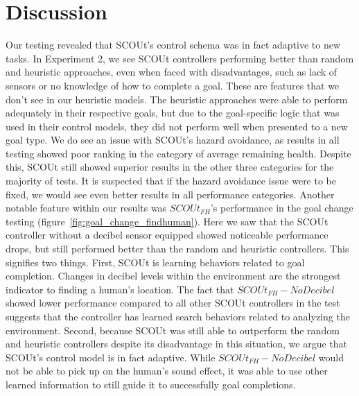 \section{Discussion}
Our testing revealed that SCOUt's control schema was in fact adaptive to new tasks.
In Experiment 2, we see SCOUt controllers performing better than random and heuristic approaches, even when faced with disadvantages, such as lack of sensors or no knowledge of how to complete a goal.
These are features that we don't see in our heuristic models.
The heuristic approaches were able to perform adequately in their respective goals, but due to the goal-specific logic that was used in their control models, they did not perform well when presented to a new goal type.
We do see an issue with SCOUt's hazard avoidance, as results in all testing showed poor ranking in the category of average remaining health.
Despite this, SCOUt still showed superior results in the other three categories for the majority of tests.
It is suspected that if the hazard avoidance issue were to be fixed, we would see even better results in all performance categories.
Another notable feature within our results was $SCOUt_{FH}$'s performance in the goal change testing (figure~\ref{fig:goal_change_findhuman}).
Here we saw that the SCOUt controller without a decibel sensor equipped showed noticeable performance drops, but still performed better than the random and heuristic controllers.
This signifies two things.
First, SCOUt is learning behaviors related to goal completion.
Changes in decibel levels within the environment are the strongest indicator to finding a human's location.
The fact that $SCOUt_{FH} - No Decibel$ showed lower performance compared to all other SCOUt controllers in the test suggests that the controller has learned search behaviors related to analyzing the environment.
Second, because SCOUt was still able to outperform the random and heuristic controllers despite its disadvantage in this situation, we argue that SCOUt's control model is in fact adaptive.
While $SCOUt_{FH} - No Decibel$ would not be able to pick up on the human's sound effect, it was able to use other learned information to still guide it to successfully goal completions.
